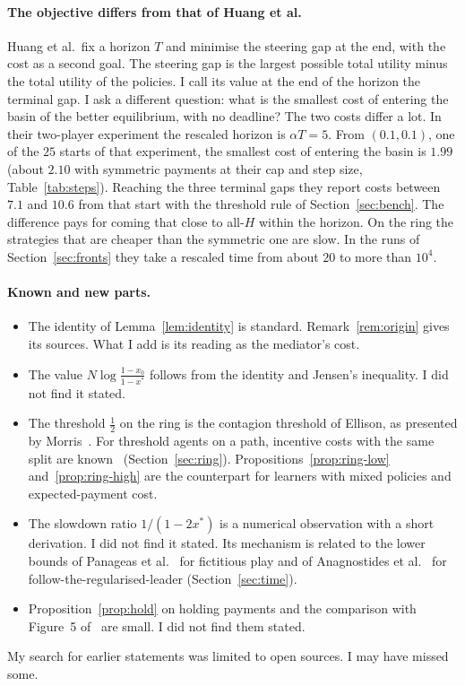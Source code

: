 \documentclass[11pt,a4paper]{article}
\theoremstyle{definition}
\theoremstyle{plain}
\newcommand{\xs}{x^{*}}
\begin{document}
\paragraph{The objective differs from that of Huang et al.}
Huang et al.\ fix a horizon $T$ and minimise the steering gap at the end, with the cost as a second goal. The steering gap is the largest possible total utility minus the total utility of the policies. I call its value at the end of the horizon the terminal gap. I ask a different question: what is the smallest cost of entering the basin of the better equilibrium, with no deadline? The two costs differ a lot. In their two-player experiment the rescaled horizon is $\alpha T=5$. From $(0.1,0.1)$, one of the $25$ starts of that experiment, the smallest cost of entering the basin is $1.99$ (about $2.10$ with symmetric payments at their cap and step size, Table~\ref{tab:steps}). Reaching the three terminal gaps they report costs between $7.1$ and $10.6$ from that start with the threshold rule of Section~\ref{sec:bench}. The difference pays for coming that close to all-$H$ within the horizon. On the ring the strategies that are cheaper than the symmetric one are slow. In the runs of Section~\ref{sec:fronts} they take a rescaled time from about $20$ to more than $10^4$.

\paragraph{Known and new parts.}\label{sec:new}
\begin{itemize}
\item The identity of Lemma~\ref{lem:identity} is standard. Remark~\ref{rem:origin} gives its sources. What I add is its reading as the mediator's cost.
\item The value $N\log\frac{1-x_0}{1-\xs}$ follows from the identity and Jensen's inequality. I did not find it stated.
\item The threshold $\tfrac12$ on the ring is the contagion threshold of Ellison, as presented by \mbox{Morris}~\cite{morris2000}. For threshold agents on a path, incentive costs with the same split are known~\cite{cordasco2018} (Section~\ref{sec:ring}). Propositions~\ref{prop:ring-low} and~\ref{prop:ring-high} are the counterpart for learners with mixed policies and expected-payment cost.
\item The slowdown ratio $1/(1-2\xs)$ is a numerical observation with a short derivation. I did not find it stated. Its mechanism is related to the lower bounds of Panageas et al.~\cite{panageas2023} for fictitious play and of Anagnostides et al.~\cite{anagnostides2026} for follow-the-regularised-leader (Section~\ref{sec:time}).
\item Proposition~\ref{prop:hold} on holding payments and the comparison with Figure~5 of~\cite{huang2025} are small. I did not find them stated.
\end{itemize}
My search for earlier statements was limited to open sources. I may have missed some.
\end{document}
